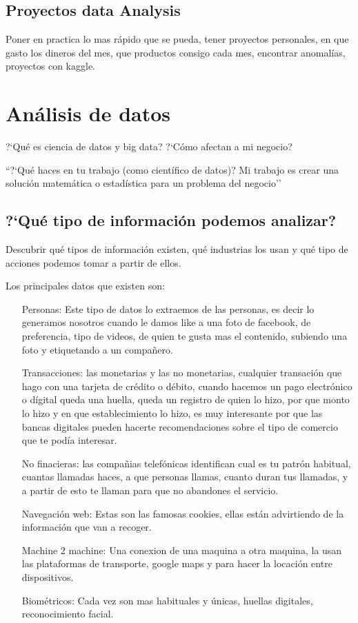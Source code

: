 \section{Proyectos data Analysis}
Poner en practica lo mas r\'apido que se pueda, tener proyectos personales, en que gasto los dineros del mes, que productos consigo cada mes, encontrar anomal\'ias, proyectos con kaggle.

\chapter{An\'alisis de datos}

?`Qu\'e es ciencia de datos y big data? ?`C\'omo afectan a mi negocio?

``?`Qu\'e haces en tu trabajo (como cient\'ifico de datos)?
Mi trabajo es crear una soluci\'on matem\'atica o estad\'istica para un problema del negocio''

\section{?`Qu\'e tipo de informaci\'on podemos analizar?}


Descubrir qu\'e tipos de informaci\'on existen, qu\'e industrias los usan y qu\'e tipo de acciones podemos tomar a partir de ellos.

Los principales datos que existen son: 

\begin{enumerate}
	\item[Personas:] Este tipo de datos lo extraemos de las personas, es decir lo generamos nosotros cuando le damos like a una foto de facebook, de preferencia, tipo de videos, de quien te gusta mas el contenido, subiendo una foto y etiquetando a un compa\~nero.
	\item[Transacciones:] las monetarias y las no monetarias, cualquier transaci\'on que hago con una tarjeta de cr\'edito o d\'ebito, cuando hacemos un pago electr\'onico o d\'igital  queda una huella, queda un registro de quien lo hizo, por que monto lo hizo y en que establecimiento lo hizo, es muy interesante por que las bancas digitales pueden hacerte recomendaciones sobre el tipo de comercio que te pod\'ia interesar.
	
	No finacieras: las compa\~nias telef\'onicas identifican cual es tu patr\'on habitual, cuantas llamadas haces, a que personas llamas, cuanto duran tus llamadas, y a partir de esto te llaman para que no abandones el servicio. 
	
	\item[Navegaci\'on web: ] Estas son las famosas cookies, ellas est\'an advirtiendo de la informaci\'on que van a recoger.
	
	\item[Machine 2 machine: ] Una conexion de una maquina a otra maquina, la usan las plataformas de transporte, google maps y para hacer la locaci\'on entre dispositivos.
	
	\item[Biom\'etricos: ] Cada vez son mas habituales y \'unicas, huellas digitales, reconocimiento facial. 

\end{enumerate}

